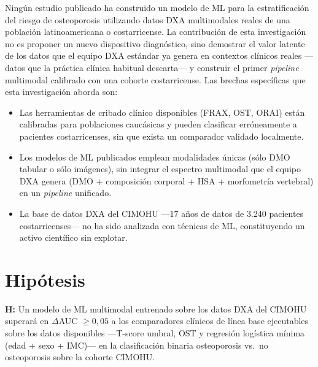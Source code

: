 \documentclass[../tesis.tex]{subfiles}
\begin{document}
Ningún estudio publicado ha construido un modelo de ML para la estratificación del riesgo de osteoporosis utilizando datos DXA multimodales reales de una población latinoamericana o costarricense. La contribución de esta investigación no es proponer un nuevo dispositivo diagnóstico, sino demostrar el valor latente de los datos que el equipo DXA estándar ya genera en contextos clínicos reales ---datos que la práctica clínica habitual descarta--- y construir el primer \textit{pipeline} multimodal calibrado con una cohorte costarricense. Las brechas específicas que esta investigación aborda son:

\begin{itemize}
    \item Las herramientas de cribado clínico disponibles (FRAX\textregistered{}, OST, ORAI) están calibradas para poblaciones caucásicas y pueden clasificar erróneamente a pacientes costarricenses, sin que exista un comparador validado localmente.

    \item Los modelos de ML publicados emplean modalidades únicas (sólo DMO tabular o sólo imágenes), sin integrar el espectro multimodal que el equipo DXA genera (DMO + composición corporal + HSA + morfometría vertebral) en un \textit{pipeline} unificado.

    \item La base de datos DXA del CIMOHU ---17 años de datos de 3.240 pacientes costarricenses--- no ha sido analizada con técnicas de ML, constituyendo un activo científico sin explotar.
\end{itemize}

\section{Hipótesis}
\label{hipotesis}

\begin{displayquote}
\textbf{H:} Un modelo de ML multimodal entrenado sobre los datos DXA del CIMOHU superará en $\Delta$AUC $\geq 0{,}05$ a los comparadores clínicos de línea base ejecutables sobre los datos disponibles ---T-score umbral, OST y regresión logística mínima (edad + sexo + IMC)--- en la clasificación binaria osteoporosis vs.\ no osteoporosis sobre la cohorte CIMOHU.
\end{displayquote}
\end{document}
